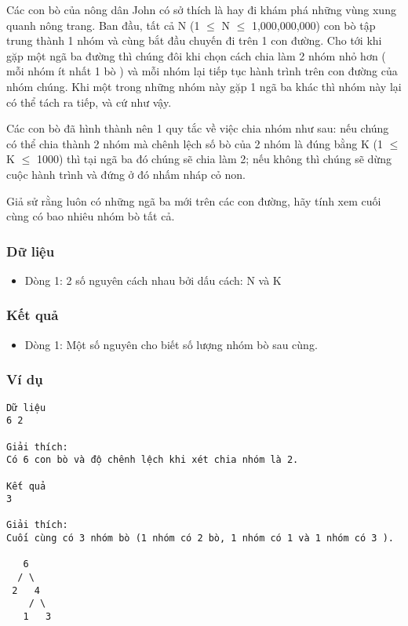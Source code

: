 



   Các con bò của nông dân John có sở thích là hay đi khám phá những  vùng xung quanh nông trang. Ban đầu, tất cả N (1  $\le$  N  $\le$  1,000,000,000)  con bò tập trung thành 1 nhóm và cùng bắt đầu chuyến đi trên  1 con đường. Cho tới khi gặp một ngã ba đường thì chúng đôi  khi chọn cách chia làm 2 nhóm nhỏ hơn ( mỗi nhóm ít nhất 1 bò )  và mỗi nhóm lại tiếp tục hành trình trên con đường của nhóm  chúng. Khi một trong những nhóm này gặp 1 ngã ba khác thì nhóm  này lại có thể tách ra tiếp, và cứ như vậy.  

   Các con bò đã hình thành nên 1 quy tắc về việc chia nhóm như sau: nếu  chúng có thể chia thành 2 nhóm mà chênh lệch số bò của 2 nhóm là đúng  bằng K (1  $\le$  K  $\le$  1000) thì tại ngã ba đó chúng sẽ chia làm 2; nếu  không thì chúng sẽ dừng cuộc hành trình và đứng ở đó nhấm nháp cỏ non.  

   Giả sử rằng luôn có những ngã ba mới trên các con đường, hãy  tính xem cuối cùng có bao nhiêu nhóm bò tất cả.  

\subsubsection{   Dữ liệu  }
\begin{itemize}
	\item     Dòng 1: 2 số nguyên cách nhau bởi dấu cách: N và K   
\end{itemize}

\subsubsection{   Kết quả  }
\begin{itemize}
	\item     Dòng 1: Một số nguyên cho biết số lượng nhóm bò sau cùng.   
\end{itemize}

\subsubsection{   Ví dụ  }
\begin{verbatim}
Dữ liệu
6 2

Giải thích:
Có 6 con bò và độ chênh lệch khi xét chia nhóm là 2.

Kết quả
3

Giải thích:
Cuối cùng có 3 nhóm bò (1 nhóm có 2 bò, 1 nhóm có 1 và 1 nhóm có 3 ).

   6
  / \
 2   4
    / \
   1   3
\end{verbatim}
